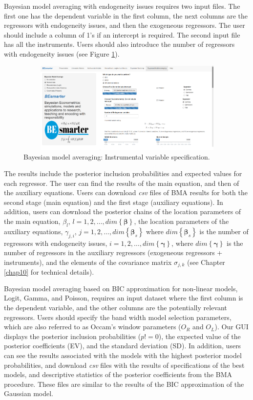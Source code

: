 Bayesian model averaging with endogeneity issues requires two input files. The first one has the dependent variable in the first column, the next columns are the regressors with endogeneity issues, and then the exogeneous regressors. The user should include a column of 1's if an intercept is required. The second input file has all the instruments. Users should also introduce the number of regressors with endogeneity issues (see Figure \ref{fig610}).

\begin{figure}
	\includegraphics[width=340pt, height=130pt]{Chapters/chapterGUI/figures/Figure10.png}
	\caption[List of figure caption goes here]{Bayesian model averaging: Instrumental variable specification.}\label{fig610}
\end{figure} 

The results include the posterior inclusion probabilities and expected values for each regressor. The user can find the results of the main equation, and then of the auxiliary equations. Users can download \textit{csv} files of BMA results for both the second stage (main equation)  and the first stage (auxiliary equations). In addition, users can download the posterior chains of the location parameters of the main equation, $\beta_{l}$, $l=1,2,\dots,dim\left\{\bm{\beta}\right\}$, the location parameters of the auxiliary equations, $\gamma_{j,i}$, $j=1,2,\dots,dim\left\{\bm{\beta}_s\right\}$ where $dim\left\{\bm{\beta}_s\right\}$ is the number of regressors with endogeneity issues, $i=1,2,\dots,dim\left\{\bm{\gamma}\right\}$, where $dim\left\{\bm{\gamma}\right\}$ is the number of regressors in the auxiliary regressors (exogeneous regressors + instruments), and the elements of the covariance matrix $\sigma_{j,k}$ (see Chapter \ref{chap10} for technical details).

Bayesian model averaging based on BIC approximation for non-linear models, Logit, Gamma, and Poisson, requires an input dataset where the first column is the dependent variable, and the other columns are the potentially relevant regressors. Users should specify the band width model selection parameters, which are also referred to as Occam's window parameters ($O_R$ and $O_L$). Our GUI displays the posterior inclusion probabilities ($p!=0$), the expected value of the posterior coefficients (EV), and the standard deviation (SD). In addition, users can see the results associated with the models with the highest posterior model probabilities, and download \textit{csv} files with the results of specifications of the best models, and descriptive statistics of the posterior coefficients from the BMA procedure. These files are similar to the results of the BIC approximation of the Gaussian model.

